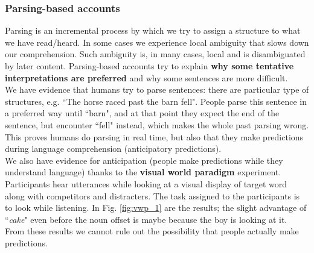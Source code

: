 \subsubsection{Parsing-based accounts}
Parsing is an incremental process by which we try to assign a structure to what we have read/heard. In some cases we experience local ambiguity that slows down our comprehension. Such ambiguity is, in many cases, local and is disambiguated by later content. Parsing-based accounts try to explain \textbf{why some tentative interpretations are preferred} and why some sentences are more difficult.\\

We have evidence that humans try to parse sentences: there are particular type of structures, e.g. ``The horse raced past the barn fell". People parse this sentence in a preferred way until ``barn", and at that point they expect the end of the sentence, but encounter ``fell" instead, which makes the whole past parsing wrong. This proves humans do parsing in real time, but also that they make predictions during language comprehension (anticipatory predictions).\\

We also have evidence for anticipation (people make predictions while they understand language) thanks to the \textbf{visual world paradigm} experiment. Participants hear utterances while looking at a visual display of target word along with competitors and distracters. The task assigned to the participants is to look while listening. In Fig. \ref{fig:vwp_1} are the results; the slight advantage of ``\textit{cake}" even before the noun offset is maybe because the boy is looking at it. From these results we cannot rule out the possibility that people actually make predictions.

